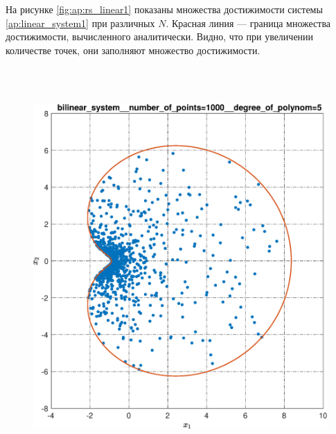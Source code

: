 \documentclass[../main.tex]{subfiles}
\begin{document}
  На рисунке \ref{fig:ap:rs_linear1} показаны множества достижимости системы \eqref{ap:linear_system1} при различных $N$.
  Красная линия --- граница множества достижимости, вычисленного аналитически.
  Видно, что при увеличении количестве точек, они заполняют множество достижимости.
  
   \begin{figure}[ht!] 
  	\hspace{-2.5ex}
  	\begin{minipage}[b]{.4\linewidth} 
  		\small
  		\centering 
  		\includegraphics[width=\linewidth]{images/bilinear_system__number_of_points=1000__degree_of_polynom=5.eps}
  	\end{minipage}
  	\hfill
  	\begin{minipage}[b]{.4\linewidth} 
  		\small
  		\centering

\end{minipage}
\end{figure}
\end{document}
